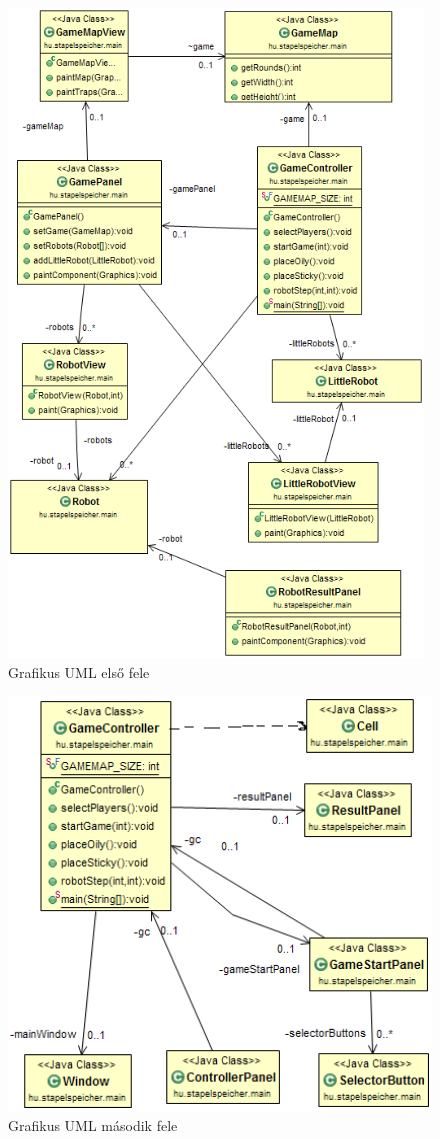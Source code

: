 \begin{figure}[h]
	\begin{center}
		\includegraphics[width=11cm]{chapters/chapter11/StapelGrafUML1.png}
		\caption{Grafikus UML első fele}
		\label{fig:Grafikus}
	\end{center}
\end{figure}

\clearpage
\begin{figure}[h]
	\begin{center}
		\includegraphics[width=14cm]{chapters/chapter11/StapelGrafUML2.png}
		\caption{Grafikus UML második fele}
		\label{fig:Grafikus}
	\end{center}
\end{figure}



